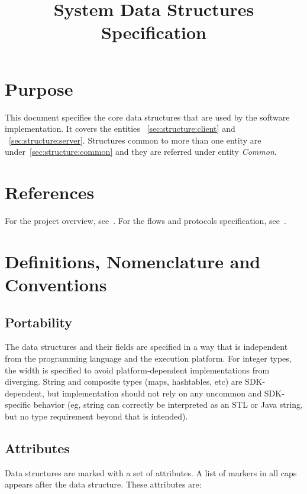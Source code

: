\documentclass[a4paper,10pt]{article}
\title{\longProduct{} System Data Structures Specification}
\newcommand{\common}{{\em Common}}
\begin{document}
\maketitle
\tableofcontents

\section{Purpose}
This document specifies the core data structures that are used by the \shortProduct{} software implementation. It covers the entities \client{}~\ref{sec:structure:client} and 
\server{}~\ref{sec:structure:server}. Structures common to more than one entity are under~\ref{sec:structure:common} and they are referred under entity \common{}.

\section{References}
For the project overview, see~\cite{project_spec}. For the flows and protocols specification, see~\cite{flow_spec}.

\section{Definitions, Nomenclature and Conventions}

\subsection{Portability}
The data structures and their fields are specified in a way that is independent from the programming language and the execution platform. For integer types, the width is specified 
to avoid platform-dependent implementations from diverging. String and composite types (maps, hashtables, etc) are SDK-dependent, but implementation should not rely on any uncommon 
and SDK-specific behavior (eg, string can correctly be interpreted as an STL or Java string, but no type requirement beyond that is intended).

\subsection{Attributes}
Data structures are marked with a set of attributes. A list of markers in all caps appears after the data structure. These attributes are:

\newcommand{\persistent}{\MakeUppercase{persistent}}
\newcommand{\ephemeral}{\MakeUppercase{ephemeral}}
\newcommand{\secure}{\MakeUppercase{secure}}
\newcommand{\unsecure}{\MakeUppercase{unsecure}}
\newcommand{\infrastructure}{\MakeUppercase{infrastructure}}
\newcommand{\unique}{\MakeUppercase{unique}}
\end{document}
